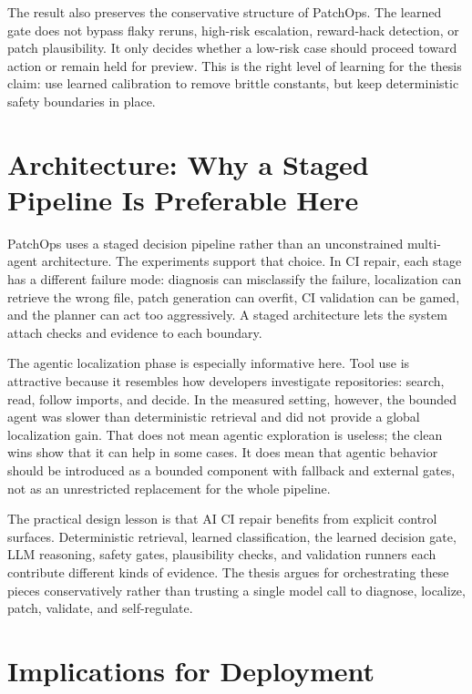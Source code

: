 The result also preserves the conservative structure of PatchOps. The learned gate does not bypass flaky
reruns, high-risk escalation, reward-hack detection, or patch plausibility. It only decides whether a low-risk
case should proceed toward action or remain held for preview. This is the right level of learning for the thesis
claim: use learned calibration to remove brittle constants, but keep deterministic safety boundaries in place.

\section{Architecture: Why a Staged Pipeline Is Preferable Here}

PatchOps uses a staged decision pipeline rather than an unconstrained multi-agent architecture. The experiments
support that choice. In CI repair, each stage has a different failure mode: diagnosis can misclassify the
failure, localization can retrieve the wrong file, patch generation can overfit, CI validation can be gamed, and
the planner can act too aggressively. A staged architecture lets the system attach checks and evidence to each
boundary.

The agentic localization phase is especially informative here. Tool use is attractive because it resembles how
developers investigate repositories: search, read, follow imports, and decide. In the measured setting, however,
the bounded agent was slower than deterministic retrieval and did not provide a global localization gain. That
does not mean agentic exploration is useless; the clean wins show that it can help in some cases. It does mean
that agentic behavior should be introduced as a bounded component with fallback and external gates, not as an
unrestricted replacement for the whole pipeline.

The practical design lesson is that AI CI repair benefits from explicit control surfaces. Deterministic
retrieval, learned classification, the learned decision gate, LLM reasoning, safety gates, plausibility checks,
and validation runners each contribute different kinds of evidence. The thesis argues for orchestrating these
pieces conservatively rather than trusting a single model call to diagnose, localize, patch, validate, and
self-regulate.

\section{Implications for Deployment}

